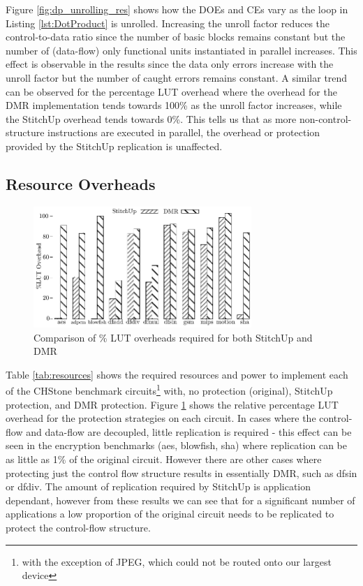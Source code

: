 Figure \ref{fig:dp_unrolling_res} shows how the DOEs and CEs vary as the loop in Listing \ref{lst:DotProduct}
is unrolled.
Increasing the unroll factor reduces the control-to-data ratio since the number of basic blocks remains constant but the number of (data-flow)
only functional units instantiated in parallel increases.
This effect is observable in the results since the data only errors increase with the unroll factor but the number of caught errors
remains constant.
A similar trend can be observed for the percentage LUT overhead where the overhead for the DMR implementation
tends towards 100\% as the unroll factor increases, while the StitchUp overhead tends towards 0\%.
This tells us that as more non-control-structure instructions are executed in parallel, the overhead or
protection provided by the StitchUp replication is unaffected.

\subsection{Resource Overheads}
\renewcommand{\arraystretch}{0.8}

\begin{figure}[t]
\centering
\includegraphics[width=3.25in]{./graphs/luts_res.pdf}
\caption{Comparison of \% LUT overheads required for both StitchUp and DMR}
\label{fig:lut_res}
\end{figure}

Table \ref{tab:resources} shows the required resources and power to implement
each of the CHStone benchmark circuits\footnote{with the exception of JPEG, which could not be routed onto our largest device}
with, no protection (original), StitchUp protection, and DMR protection.
Figure \ref{fig:lut_res} shows the relative percentage LUT overhead for the protection strategies on each circuit.
In cases where the control-flow and data-flow are decoupled, little replication is required - this effect can be seen in
the encryption benchmarks (aes, blowfish, sha) where replication can be as little as 1\% of the original circuit.
However there are other cases where protecting just the control flow structure results in essentially DMR, such as dfsin or dfdiv.
The amount of replication required by StitchUp is application dependant, however from these results we can see
that for a significant number of applications a low proportion of the original circuit needs to be replicated to
protect the control-flow structure.


